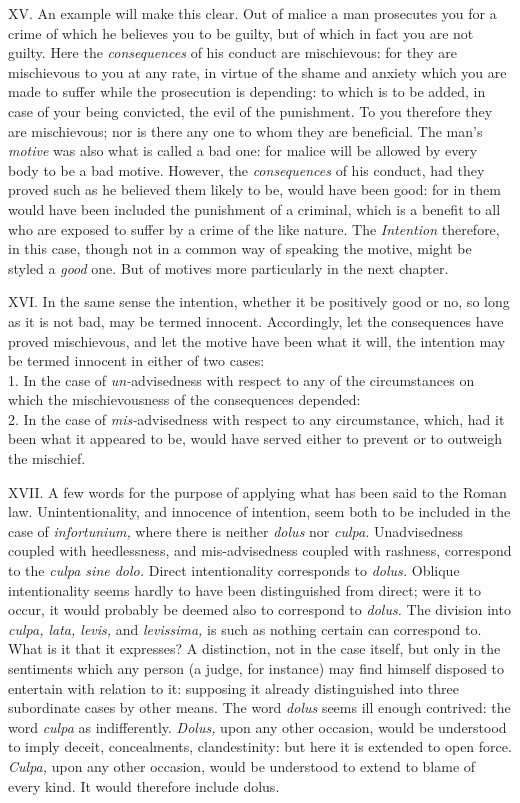 \documentclass[12pt]{report}
\begin{document}
XV. An example will make this clear. Out of malice a man prosecutes you
for a crime of which he believes you to be guilty, but of which in fact
you are not guilty. Here the \emph{consequences} of his conduct are
mischievous: for they are mischievous to you at any rate, in virtue of
the shame and anxiety which you are made to suffer while the prosecution
is depending: to which is to be added, in case of your being convicted,
the evil of the punishment. To you therefore they are mischievous; nor
is there any one to whom they are beneficial. The man's \emph{motive}
was also what is called a bad one: for malice will be allowed by every
body to be a bad motive. However, the \emph{consequences} of his
conduct, had they proved such as he believed them likely to be, would
have been good: for in them would have been included the punishment of a
criminal, which is a benefit to all who are exposed to suffer by a crime
of the like nature. The \emph{Intention} therefore, in this case, though
not in a common way of speaking the motive, might be styled a
\emph{good} one. But of motives more particularly in the next chapter.

XVI. In the same sense the intention, whether it be positively good or
no, so long as it is not bad, may be termed innocent. Accordingly, let
the consequences have proved mischievous, and let the motive have been
what it will, the intention may be termed innocent in either of two
cases:\\
1. In the case of \emph{un-}advisedness with respect to any of the
circumstances on which the mischievousness of the consequences
depended:\\
2. In the case of \emph{mis-}advisedness with respect to any
circumstance, which, had it been what it appeared to be, would have
served either to prevent or to outweigh the mischief.

XVII. A few words for the purpose of applying what has been said to the
Roman law. Unintentionality, and innocence of intention, seem both to be
included in the case of \emph{infortunium,} where there is neither
\emph{dolus} nor \emph{culpa.} Unadvisedness coupled with heedlessness,
and mis-advisedness coupled with rashness, correspond to the \emph{culpa
sine dolo.} Direct intentionality corresponds to \emph{dolus.} Oblique
intentionality seems hardly to have been distinguished from direct; were
it to occur, it would probably be deemed also to correspond to
\emph{dolus.} The division into \emph{culpa, lata, levis,} and
\emph{levissima,} is such as nothing certain can correspond to. What is
it that it expresses? A distinction, not in the case itself, but only in
the sentiments which any person (a judge, for instance) may find himself
disposed to entertain with relation to it: supposing it already
distinguished into three subordinate cases by other means. The word
\emph{dolus} seems ill enough contrived: the word \emph{culpa} as
indifferently. \emph{Dolus,} upon any other occasion, would be
understood to imply deceit, concealments, clandestinity: but here it is
extended to open force. \emph{Culpa,} upon any other occasion, would be
understood to extend to blame of every kind. It would therefore include
dolus.
\end{document}
